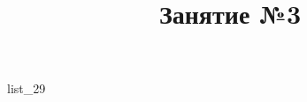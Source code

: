 \documentclass[12pt, a4paper]{article}
\begin{document}
	\title{Занятие №3}
	{list_29}
\end{document}

